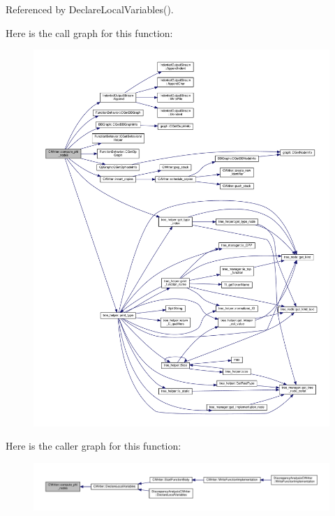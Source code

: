 Referenced by Declare\+Local\+Variables().

Here is the call graph for this function\+:
\nopagebreak
\begin{figure}[H]
\begin{center}
\leavevmode
\includegraphics[width=350pt]{d3/d59/classCWriter_a5d4cb518818feb0e8ef025fa7b93b123_cgraph}
\end{center}
\end{figure}
Here is the caller graph for this function\+:
\nopagebreak
\begin{figure}[H]
\begin{center}
\leavevmode
\includegraphics[width=350pt]{d3/d59/classCWriter_a5d4cb518818feb0e8ef025fa7b93b123_icgraph}
\end{center}
\end{figure}
\mbox{\label{classCWriter_a9eadef932300ac395a17c244453a580f}} 
